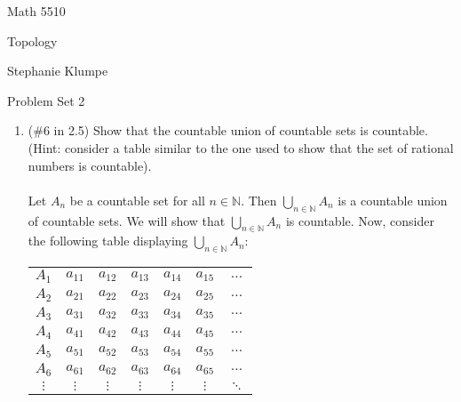 \documentclass[12pt]{article}
\begin{document}
\noindent Math 5510

\noindent Topology

\noindent Stephanie Klumpe

\vspace{.2in}
\begin{center}
Problem Set 2
\end{center}

 \begin{enumerate}
\item (\#6 in 2.5) Show that the countable union of countable sets is countable. (Hint: consider a table similar to the one used to show that the set of rational numbers is countable).\\\\
Let $A_n$ be a countable set for all $n\in\mathbb{N}$. Then $\bigcup_{n\in\mathbb{N}}A_n$ is a countable union of countable sets. We will show that $\bigcup_{n\in\mathbb{N}}A_n$ is countable. Now, consider the following table displaying $\bigcup_{n\in\mathbb{N}}A_n$: \begin{center}
\begin{tabular}{ c|   c   c   c   c   c   c   }
$A_1$ & $a_{11}$ & $a_{12}$ & $a_{13}$ & $a_{14}$ & $a_{15}$ & $\dots$ \\ 
$A_2$ & $a_{21}$ & $a_{22}$ & $a_{23}$ & $a_{24}$ & $a_{25}$ & $\dots$ \\  
$A_3$ & $a_{31}$ & $a_{32}$ & $a_{33}$ & $a_{34}$ & $a_{35}$ & $\dots$ \\
$A_4$ & $a_{41}$ & $a_{42}$ & $a_{43}$ & $a_{44}$ & $a_{45}$ & $\dots$ \\
$A_5$ & $a_{51}$ & $a_{52}$ & $a_{53}$ & $a_{54}$ & $a_{55}$ & $\dots$ \\
$A_6$ & $a_{61}$ & $a_{62}$ & $a_{63}$ & $a_{64}$ & $a_{65}$ & $\dots$ \\
$\vdots$ & $\vdots$ & $\vdots$ & $\vdots$ & $\vdots$ & $\vdots$ & $\ddots$ \\
\end{tabular}
\end{center}

\end{enumerate}
\end{document}
